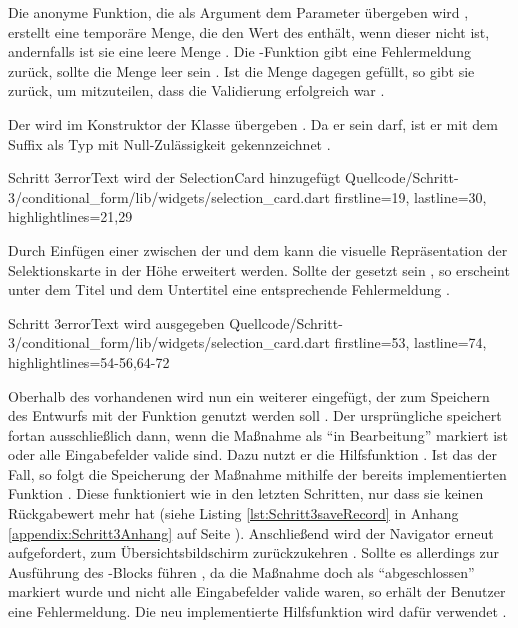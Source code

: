 Die anonyme Funktion, die als Argument dem Parameter  übergeben wird , erstellt eine temporäre Menge, die den Wert des  enthält, wenn dieser nicht  ist, andernfalls ist sie eine leere Menge .
Die -Funktion gibt eine Fehlermeldung zurück, sollte die Menge leer sein .
Ist die Menge dagegen gefüllt, so gibt sie  zurück, um mitzuteilen, dass die Validierung erfolgreich war .



Der  wird im Konstruktor der Klasse  übergeben .
Da er  sein darf, ist er mit dem Suffix  als Typ mit Null-Zulässigkeit gekennzeichnet .

\begin{alexlisting}{Schritt 3}{errorText wird der SelectionCard hinzugefügt}
    {Quellcode/Schritt-3/conditional_form/lib/widgets/selection_card.dart}
    {firstline=19, lastline=30, highlightlines={21,29}}
    \label{lst:Schritt3errorText}
\end{alexlisting}

Durch Einfügen einer  zwischen der   und dem   kann die visuelle Repräsentation der Selektionskarte in der Höhe erweitert werden.
Sollte der  gesetzt sein , so erscheint unter dem Titel und dem Untertitel eine entsprechende Fehlermeldung .
 

\begin{alexlisting}{Schritt 3}{errorText wird ausgegeben}
    {Quellcode/Schritt-3/conditional_form/lib/widgets/selection_card.dart}
    {firstline=53, lastline=74, highlightlines={54-56,64-72}}
    \label{lst:Schritt3ColumnErrorText}
\end{alexlisting}

Oberhalb des vorhandenen  wird nun ein weiterer eingefügt, der zum Speichern des Entwurfs mit der Funktion  genutzt werden soll .
Der ursprüngliche  speichert fortan ausschließlich dann, wenn die Maßnahme als \enquote{in Bearbeitung} markiert ist oder alle Eingabefelder valide sind.
Dazu nutzt er die Hilfsfunktion  .
Ist das der Fall, so folgt die Speicherung der Maßnahme mithilfe der bereits implementierten Funktion  .
Diese funktioniert wie in den letzten Schritten, nur dass sie keinen Rückgabewert mehr hat (siehe Listing \ref{lst:Schritt3saveRecord} in Anhang \ref{appendix:Schritt3Anhang} auf Seite \pageref{appendix:Schritt3Anhang}).
Anschließend wird der Navigator erneut aufgefordert, zum Übersichtsbildschirm zurückzukehren .
Sollte es allerdings zur Ausführung des -Blocks führen ,
da die Maßnahme doch als \enquote{abgeschlossen} markiert wurde und nicht alle Eingabefelder valide waren,
so erhält der Benutzer eine Fehlermeldung. Die neu implementierte Hilfsfunktion  wird dafür verwendet . 
   
